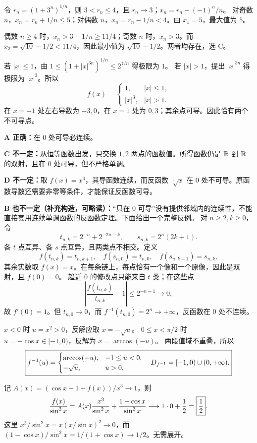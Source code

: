 \newpage
{}
令 $r_n=(1+3^n)^{1/n}$，则 $3<r_n\le4$，且 $r_n\to3$；$x_n=r_n-(-1)^n/n$。
对奇数 $n$，$x_n=r_n+1/n\le5$；对偶数 $n$，$x_n=r_n-1/n<4$。由 $x_1=5$，最大值为 $5$。

偶数 $n\ge4$ 时，$x_n>3-1/n\ge11/4$；奇数 $n$ 时，$x_n>3$。而
$x_2=\sqrt{10}-1/2<11/4$，因此最小值为 $\sqrt{10}-1/2$。两者均存在，选 C。

若 $|x|\le1$，由 $1\le(1+|x|^{3n})^{1/n}\le2^{1/n}$ 得极限为 $1$。
若 $|x|>1$，提出 $|x|^{3n}$ 得极限为 $|x|^3$。所以
\[
f(x)=\begin{cases}1,&|x|\le1,\\|x|^3,&|x|>1.\end{cases}
\]
在 $x=-1$ 处左右导数为 $-3,0$，在 $x=1$ 处为 $0,3$；其余点可导。因此恰有两个不可导点。

\textbf{A 正确：}在 $0$ 处可导必连续。

\textbf{C 不一定：}从恒等函数出发，只交换 $1,2$ 两点的函数值。所得函数仍是 $\mathbb R$ 到 $\mathbb R$ 的双射，且在 $0$ 处可导，但不严格单调。

\textbf{D 不一定：}取 $f(x)=x^3$，其导函数连续，而反函数 $\sqrt[3]x$ 在 $0$ 处不可导。原函数导数还需要非零等条件，才能保证反函数可导。

\textbf{B 也不一定（补充构造，可略读）：}“只在 $0$ 可导”没有提供邻域内的连续性，不能直接套用连续单调函数的反函数定理。下面给出一个完整反例。
对 $n\ge2,k\ge0$，令
\[
t_{n,k}=2^{-n}+2^{-2n-k},\qquad s_{n,k}=2^n(2k+1).
\]
各 $t$ 点互异、各 $s$ 点互异，且两类点不相交。定义
\[
f(t_{n,k})=t_{n,k+1},\quad f(s_{n,0})=t_{n,0},\quad
f(s_{n,k+1})=s_{n,k},
\]
其余实数取 $f(x)=x$。在每条链上，每点恰有一个像和一个原像，因此是双射，且 $f(0)=0$。
趋近 $0$ 的修改点只能来自 $t$ 类；在这些点
\[
\left|\frac{f(t_{n,k})}{t_{n,k}}-1\right|\le2^{-n-1}\longrightarrow0,
\]
故 $f'(0)=1$。但 $t_{n,0}\to0$，而 $f^{-1}(t_{n,0})=2^n\to+\infty$，反函数在 $0$ 处不连续。

\newpage
{}
$x<0$ 时 $u=x^2>0$，反解应取 $x=-\sqrt u$。
$0\le x<\pi/2$ 时 $u=-\cos x\in[-1,0)$，反解为 $x=\arccos(-u)$。
两段值域不重叠，所以
\[
\boxed{f^{-1}(u)=\begin{cases}\arccos(-u),&-1\le u<0,\\-\sqrt u,&u>0,\end{cases}
\quad D_{f^{-1}}=[-1,0)\cup(0,+\infty).}
\]

记 $A(x)=(\cos x-1+f(x))/x^3\to1$，则
\[
\frac{f(x)}{\sin^2x}
=A(x)\frac{x^3}{\sin^2x}+\frac{1-\cos x}{\sin^2x}
\longrightarrow 1\cdot0+\frac12=\boxed{\frac12}.
\]
这里 $x^3/\sin^2x=x(x/\sin x)^2\to0$，而 $(1-\cos x)/\sin^2x=1/(1+\cos x)\to1/2$。无需展开。

